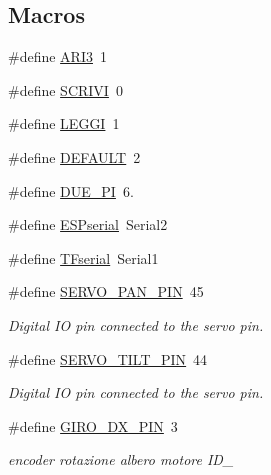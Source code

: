 \subsection*{Macros}
\begin{DoxyCompactItemize}
\item 
\#define \mbox{\hyperlink{ari_pi__2_d_c__esp__08_8ino_af5e2c0a692b6b075e9a95ac11a5c5b06}{A\+R\+I3}}~1
\item 
\#define \mbox{\hyperlink{ari_pi__2_d_c__esp__08_8ino_a0795d970ec6b0998fc398ecba0dc1fbc}{S\+C\+R\+I\+VI}}~0
\item 
\#define \mbox{\hyperlink{ari_pi__2_d_c__esp__08_8ino_a6f99aa69652bb4f0435fbf31d21ba7c9}{L\+E\+G\+GI}}~1
\item 
\#define \mbox{\hyperlink{ari_pi__2_d_c__esp__08_8ino_a3da44afeba217135a680a7477b5e3ce3}{D\+E\+F\+A\+U\+LT}}~2
\item 
\#define \mbox{\hyperlink{ari_pi__2_d_c__esp__08_8ino_a8e296a962daed7fa0ffeeab350593594}{D\+U\+E\+\_\+\+PI}}~6.
\item 
\#define \mbox{\hyperlink{ari_pi__2_d_c__esp__08_8ino_a3059d914dc801da27fea64290d8f0a28}{E\+S\+Pserial}}~Serial2
\item 
\#define \mbox{\hyperlink{ari_pi__2_d_c__esp__08_8ino_a09582c1cafb46dfb44288122f23ed702}{T\+Fserial}}~Serial1
\item 
\#define \mbox{\hyperlink{ari_pi__2_d_c__esp__08_8ino_acc60ca04f3ee450b48548582048ed8fa}{S\+E\+R\+V\+O\+\_\+\+P\+A\+N\+\_\+\+P\+IN}}~45
\begin{DoxyCompactList}\small\item\em Digital IO pin connected to the servo pin. \end{DoxyCompactList}\item 
\#define \mbox{\hyperlink{ari_pi__2_d_c__esp__08_8ino_aacf6d5e66edfb457b13cbced950fc0af}{S\+E\+R\+V\+O\+\_\+\+T\+I\+L\+T\+\_\+\+P\+IN}}~44
\begin{DoxyCompactList}\small\item\em Digital IO pin connected to the servo pin. \end{DoxyCompactList}\item 
\#define \mbox{\hyperlink{ari_pi__2_d_c__esp__08_8ino_a594090dbf515f41d4249fade4f14c463}{G\+I\+R\+O\+\_\+\+D\+X\+\_\+\+P\+IN}}~3
\begin{DoxyCompactList}\small\item\em encoder rotazione albero motore I\+D\+\_ \end{DoxyCompactList}\item 

\end{DoxyCompactItemize}

